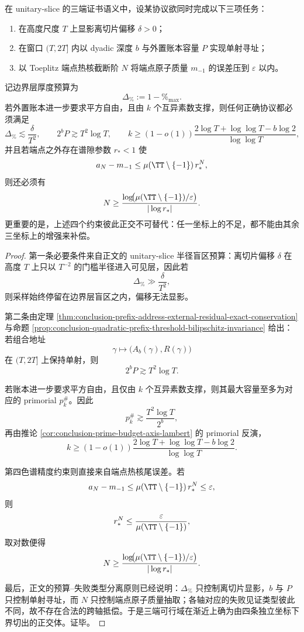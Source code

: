 \begin{theorem}[三端证书可行域的正交体刚性]\label{thm:conclusion-three-end-certificate-orthotope-rigidity}
在 unitary-slice 的三端证书语义中，设某协议欲同时完成以下三项任务：
\begin{enumerate}
  \item 在高度尺度 \(T\) 上显影离切片偏移 \(\delta>0\)；
  \item 在窗口 \((T,2T]\) 内以 dyadic 深度 \(b\) 与外置账本容量 \(P\) 实现单射寻址；
  \item 以 Toeplitz 端点热核截断阶 \(N\) 将端点原子质量 \(m_{-1}\) 的误差压到 \(\varepsilon\) 以内。
\end{enumerate}
记边界层厚度预算为
\[
\Delta_{\%}:=1-\%_{\max}.
\]
若外置账本进一步要求平方自由，且由 \(k\) 个互异素数支撑，则任何正确协议都必须满足
\[
\Delta_{\%}\lesssim \frac{\delta}{T^2},
\qquad
2^bP\gtrsim T^2\log T,
\qquad
k\ge (1-o(1))\frac{2\log T+\log\log T-b\log 2}{\log\log T},
\]
并且若端点之外存在谱隙参数 \(r_*<1\) 使
\[
a_N-m_{-1}\le \mu(\TT\setminus\{-1\})\,r_*^N,
\]
则还必须有
\[
N\ge \frac{\log\!\bigl(\mu(\TT\setminus\{-1\})/\varepsilon\bigr)}{|\log r_*|}.
\]
更重要的是，上述四个约束彼此正交不可替代：任一坐标上的不足，都不能由其余三坐标上的增强来补偿。
\end{theorem}
\begin{proof}
第一条必要条件来自正文的 unitary-slice 半径盲区预算：离切片偏移 \(\delta\) 在高度 \(T\) 上只以 \(T^{-2}\) 的门槛半径进入可见层，因此若
\[
\Delta_{\%}\gg \frac{\delta}{T^2},
\]
则采样始终停留在边界层盲区之内，偏移无法显影。

第二条由定理 \ref{thm:conclusion-prefix-address-external-residual-exact-conservation} 与命题 \ref{prop:conclusion-quadratic-prefix-threshold-bilipschitz-invariance} 给出：若组合地址
\[
\gamma\longmapsto \bigl(A_b(\gamma),R(\gamma)\bigr)
\]
在 \((T,2T]\) 上保持单射，则
\[
2^bP\gtrsim T^2\log T.
\]

若账本进一步要求平方自由，且仅由 \(k\) 个互异素数支撑，则其最大容量至多为对应的 primorial \(p_k^\#\)。因此
\[
p_k^\#\gtrsim \frac{T^2\log T}{2^b},
\]
再由推论 \ref{cor:conclusion-prime-budget-axis-lambert} 的 primorial 反演，
\[
k\ge (1-o(1))\frac{2\log T+\log\log T-b\log 2}{\log\log T}.
\]

第四色谱精度约束则直接来自端点热核尾误差。若
\[
a_N-m_{-1}\le \mu(\TT\setminus\{-1\})\,r_*^N\le \varepsilon,
\]
则
\[
r_*^N\le \frac{\varepsilon}{\mu(\TT\setminus\{-1\})},
\]
取对数便得
\[
N\ge \frac{\log\!\bigl(\mu(\TT\setminus\{-1\})/\varepsilon\bigr)}{|\log r_*|}.
\]

最后，正文的预算--失败类型分离原则已经说明：\(\Delta_{\%}\) 只控制离切片显影，\(b\) 与 \(P\) 只控制单射寻址，而 \(N\) 只控制端点原子质量抽取；各轴对应的失败见证类型彼此不同，故不存在合法的跨轴抵偿。于是三端可行域在渐近上确为由四条独立坐标下界切出的正交体。证毕。
\end{proof}


